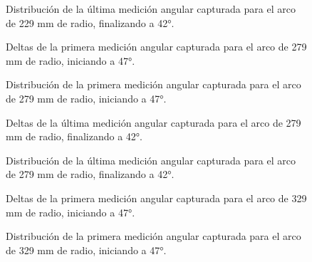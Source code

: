 \begin{figure}[H]
	\centering
	\caption{Distribución de la última medición angular capturada para el arco de 229 mm de radio, finalizando a 42°.}
	\label{fig:histograma_theta42_3}
\end{figure}

\begin{figure}[H]
	\centering
	\caption{Deltas de la primera medición angular capturada para el arco de 279 mm de radio, iniciando a 47°.}
	\label{fig:lecturas_theta47_4}
\end{figure}

\begin{figure}[H]
	\centering
	\caption{Distribución de la primera medición angular capturada para el arco de 279 mm de radio, iniciando a 47°.}
	\label{fig:histograma_theta47_4}
\end{figure}

\begin{figure}[H]
	\centering
	\caption{Deltas de la última medición angular capturada para el arco de 279 mm de radio, finalizando a 42°.}
	\label{fig:lecturas_theta42_4}
\end{figure}

\begin{figure}[H]
	\centering
	\caption{Distribución de la última medición angular capturada para el arco de 279 mm de radio, finalizando a 42°.}
	\label{fig:histograma_theta42_4}
\end{figure}

\begin{figure}[H]
	\centering
	\caption{Deltas de la primera medición angular capturada para el arco de 329 mm de radio, iniciando a 47°.}
	\label{fig:lecturas_theta47_5}
\end{figure}

\begin{figure}[H]
	\centering
	\caption{Distribución de la primera medición angular capturada para el arco de 329 mm de radio, iniciando a 47°.}
	\label{fig:histograma_theta47_5}
\end{figure}


